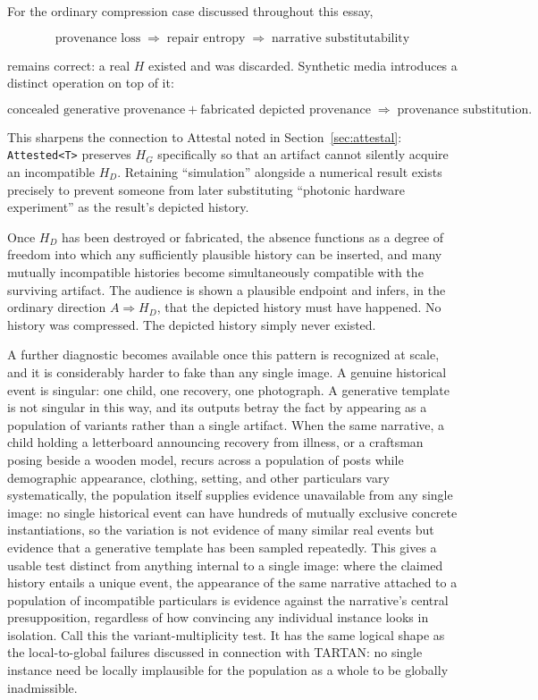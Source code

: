 \documentclass[11pt]{article}
\begin{document}
For the ordinary compression case discussed throughout this essay,

\[
\boxed{\text{provenance loss} \;\Rightarrow\; \text{repair entropy} \;\Rightarrow\; \text{narrative substitutability}}
\]

remains correct: a real $H$ existed and was discarded. Synthetic media introduces a distinct operation on top of it:

\[
\boxed{\text{concealed generative provenance} + \text{fabricated depicted provenance} \;\Rightarrow\; \text{provenance substitution}.}
\]

This sharpens the connection to Attestal noted in Section~\ref{sec:attestal}: \texttt{Attested<T>} preserves $H_G$ specifically so that an artifact cannot silently acquire an incompatible $H_D$. Retaining ``simulation'' alongside a numerical result exists precisely to prevent someone from later substituting ``photonic hardware experiment'' as the result's depicted history.

Once $H_D$ has been destroyed or fabricated, the absence functions as a degree of freedom into which any sufficiently plausible history can be inserted, and many mutually incompatible histories become simultaneously compatible with the surviving artifact. The audience is shown a plausible endpoint and infers, in the ordinary direction $A \Rightarrow H_D$, that the depicted history must have happened. No history was compressed. The depicted history simply never existed.

A further diagnostic becomes available once this pattern is recognized at scale, and it is considerably harder to fake than any single image. A genuine historical event is singular: one child, one recovery, one photograph. A generative template is not singular in this way, and its outputs betray the fact by appearing as a population of variants rather than a single artifact. When the same narrative, a child holding a letterboard announcing recovery from illness, or a craftsman posing beside a wooden model, recurs across a population of posts while demographic appearance, clothing, setting, and other particulars vary systematically, the population itself supplies evidence unavailable from any single image: no single historical event can have hundreds of mutually exclusive concrete instantiations, so the variation is not evidence of many similar real events but evidence that a generative template has been sampled repeatedly. This gives a usable test distinct from anything internal to a single image: where the claimed history entails a unique event, the appearance of the same narrative attached to a population of incompatible particulars is evidence against the narrative's central presupposition, regardless of how convincing any individual instance looks in isolation. Call this the variant-multiplicity test. It has the same logical shape as the local-to-global failures discussed in connection with TARTAN: no single instance need be locally implausible for the population as a whole to be globally inadmissible.
\end{document}
